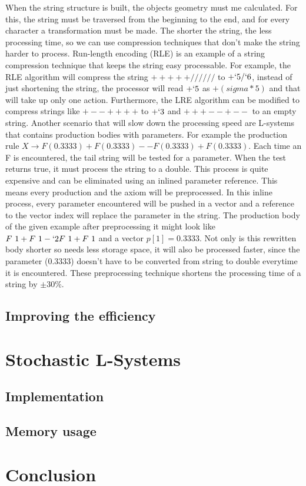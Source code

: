 \documentclass[11pt,a4paper]{article}
\begin{document}
When the string structure is built, the objects geometry must me calculated. For this, the string must be traversed from the beginning to the end, and for every character a transformation must be made. The shorter the string, the less processing time, so we can use compression techniques that don't make the string harder to process. Run-length encoding (RLE) is an example of a string compression technique that keeps the string easy processable. For example, the RLE algorithm will compress the string $+++++//////$ to $+`5/`6$, instead of just shortening the string, the processor will read $+`5$ as $+(sigma*5)$ and that will take up only one action. Furthermore, the LRE algorithm can be modified to compress strings like $+--++++$ to $+`3$ and $+++--+--$ to an empty string.
Another scenario that will slow down the processing speed are L-systems that contains production bodies with parameters. For example the production rule $X \rightarrow F(0.3333)+F(0.3333)--F(0.3333)+F(0.3333)$. Each time an F is encountered, the tail string will be tested for a parameter. When the test returns true, it must process the string to a double. This process is quite expensive and can be eliminated using an inlined parameter reference. This means every production and the axiom will be preprocessed. In this inline process, every parameter encountered will be pushed in a vector and a reference to the vector index will replace the parameter in the string. The production body of the given example after preprocessing it might look like $F~1+F~1-`2F~1+F~1$ and a vector $p[1]=0.3333$. Not only is this rewritten body shorter so needs less storage space, it will also be processed faster, since the parameter (0.3333) doesn't have to be converted from string to double everytime it is encountered.
These preprocessing technique shortens the processing time of a string by $\pm 30\%$.

\subsection{Improving the efficiency}


\section{Stochastic L-Systems} %
\subsection{Implementation}



\subsection{Memory usage}


\section{Conclusion}

\newpage
\begin{appendix}
\listoffigures
\end{appendix}
\end{document}
